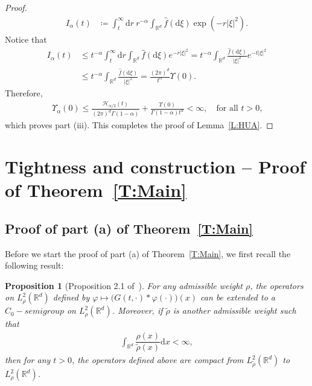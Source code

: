 \documentclass[sn-mathphys]{sn-jnl}%
\renewcommand{\R}{\mathbb{R}}
\newcommand{\ud}{\ensuremath{\mathrm{d}}}
\numberwithin{equation}{section}
\theoremstyle{thmstyleone}%
\newtheorem{proposition}[theorem]{Proposition}%
\theoremstyle{thmstyletwo}%
\theoremstyle{thmstylethree}%
\begin{document}
\begin{proof}
\begin{align*}
    I_\alpha(t)            & \coloneqq \int_t^\infty \ud r \: r^{-\alpha} \int_{\R^d} \widehat{f}(\ud\xi)\exp\left(-r\lvert\xi\rvert^2\right).
  \end{align*}
  Notice that
  \begin{align*}
    I_\alpha(t)
    &\le t^{-\alpha} \int_t^\infty \ud r \int_{\R^d} \widehat{f}(\ud\xi)e^{-r\lvert\xi\rvert^2}
    =   t^{-\alpha} \int_{\R^d} \frac{\widehat{f}(\ud\xi)}{\lvert\xi\rvert^2} e^{-t\lvert\xi\rvert^2}\\
    &\le t^{-\alpha} \int_{\R^d} \frac{\widehat{f}(\ud\xi)}{\lvert \xi \rvert^2}
    =   \frac{\left(2\pi\right)^d}{t^{\alpha}} \Upsilon(0).
  \end{align*}
  Therefore,
  \begin{align*}
    \Upsilon_{\alpha}(0) \le \frac{\mathcal{H}_{\alpha/2}(t)}{(2\pi)^d\Gamma(1-\alpha)} +
    \frac{\Upsilon(0)}{\Gamma\left(1-\alpha\right)t^{\alpha}} <\infty, \quad \text{for all $t>0$,}
  \end{align*}
  which proves part (iii). This completes the proof of Lemma~\ref{L:HUA}.
\end{proof}

\section{Tightness and construction -- Proof of Theorem~\ref{T:Main}}\label{S:mainproof}
\subsection{Proof of part (a) of Theorem~\ref{T:Main}}

Before we start the proof of part (a) of Theorem~\ref{T:Main}, we first recall the following result:

\begin{proposition}[Proposition 2.1 of~\cite{tessitore.zabczyk:98:invariant}]\label{P:weight}
  For any admissible weight $\rho$, the operators on $L^2_\rho(\R^d)$ defined by $\varphi \mapsto
  \big(G(t,\cdot)*\varphi(\cdot)\big)(x)$ can be extended to a $C_0-semigroup$ on $L^2_\rho(\R^d)$.
  Moreover, if $\tilde{\rho}$ is another admissible weight such that
	\begin{align*}
	\int_{\R^d}\dfrac{\rho(x)}{\tilde{\rho}(x)}\ud x < \infty,
	\end{align*}
	then for any $t>0$, the operators defined above are compact from $L^2_{\tilde{\rho}}(\R^d)$ to
	$L^2_\rho(\R^d)$.
\end{proposition}
\end{document}
